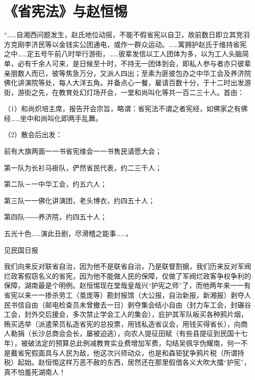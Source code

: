 \section{《省宪法》与赵恒惕}


“……自湘西问题发生，赵氏地位动摇，不能不假省宪以自卫，故前数日即立其党羽方克刚李济民等以金钱实公团通电，或作一群众运动。……寓拥护赵氏于维持省宪之中……定五号午前八时举行游街，……彼辈发信以工人团体为多，以为工人头脑简单，必有千余人可来，是日候至十时，不持无一团体到会，即私人参与者亦只彼辈亲朋数人而已，彼等焦急万分，又派人四出；至素为匪彼包办之中华工会及养济院佛化讲演院等处，每人大洋五角。并备点心一餐，雇请百数十分，于十二时出发游街，游街之先，在教育处幻灯场开会，一堂和尚叫化等共一百二三十人。首由：

（1）和尚炽培主席，报告开会宗旨，略谓：省宪法不谓之者宪经，如佛家之有佛经……坐中和尚叫化即两手乱舞。

（2）散会后出发：

前有大旗两面一一书省宪维会一一书售民请愿大会；

第一队为长衫马褂队，俨然省民代表，约二三千人；

第二队－一中华工会，约五六人；

第三队一一佛化讲演团，老头博衣，约四五十人；

第四队――养济院，约四五十人；

五光十色……演此丑剧，尽滑稽之能事……，

见民国日报

我们向来反对联省自治，因为他不是联省自治，乃是联督割据，我们历来反对军阀烂政客假窃名义的省宪，因为他不能做人民的保障，仅做了军阀烂政客争权争利的保障，湖南最是个明例。赵恒惕现在堂哉皇哉兴“护宪之师”了，而他两年来一一有省宪以来一一掺杀劳工（茧庞等）勘封报馆（大公报，自治新报，新湘报）剥夺人民书信自由（邮电检查员未曾撤去一日）剥夺集会结小自由（封力车工会，封碾谷工会，封外交后援会，多次禁止学会工人的集会），庇护其军队皈买各种鸦片烟，贿买选举（派遣荣员私造省宪的总投票，用钱私造省议会，用钱买得省长），向商人勒捐（长沙总商会会长，屡被迫逃），向农人提征田赋（有些县提征到民国十七年），被破法定的预算总此例减教育实业费增加军费，勾结吴佩孚伪耀南，何一不是戴省宪假面具与人民为敌，他这次兴师动众，也是和森钜犹争鸦片税（所谓持税）起始。赵恒惕这样万恶不赦的东西，居然还在那里假借各义大吹大擂“护宪”，真不怕羞死湖南人！

